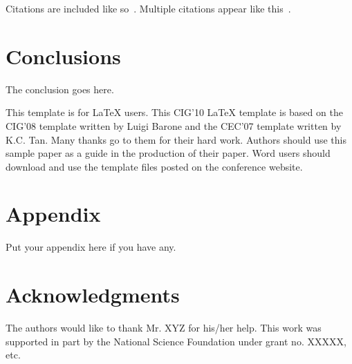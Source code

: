 \documentclass[conference]{IEEEtran}
\begin{document}
Citations are included like so~\cite{book}.
Multiple citations appear like this~\cite{conf,article}.

\section{Conclusions}
The conclusion goes here.

This template is for LaTeX users. This CIG'10 LaTeX template is
based on the CIG'08 template written by Luigi Barone and the CEC'07
template written by K.C. Tan. Many thanks go to them for their hard
work. Authors should use this sample paper as a guide in the
production of their paper. Word users should download and use the
template files posted on the conference website.

\section*{Appendix}
Put your appendix here if you have any.

\section*{Acknowledgments}
The authors would like to thank Mr. XYZ for his/her help.
This work was supported in part by the National Science Foundation
under grant no. XXXXX, etc.


%
%
%
%
\end{document}
